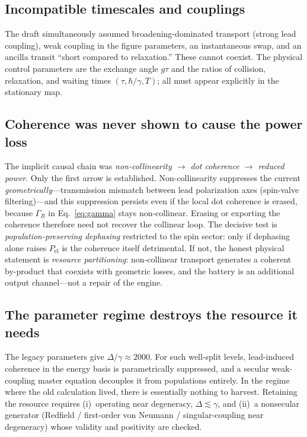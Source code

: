 \documentclass[11pt,a4paper]{article}
\begin{document}
\subsection{Incompatible timescales and couplings}

The draft simultaneously assumed broadening-dominated transport (strong lead coupling), weak coupling in the figure parameters, an instantaneous swap, and an ancilla transit ``short compared to relaxation.'' These cannot coexist. The physical control parameters are the exchange angle $g\tau$ and the ratios of collision, relaxation, and waiting times $(\tau,\hbar/\gamma,T)$; all must appear explicitly in the stationary map.

\subsection{Coherence was never shown to cause the power loss}

The implicit causal chain was \emph{non-collinearity $\to$ dot coherence $\to$ reduced power}. Only the first arrow is established. Non-collinearity suppresses the current \emph{geometrically}---transmission mismatch between lead polarization axes (spin-valve filtering)---and this suppression persists even if the local dot coherence is erased, because $\Gamma_R$ in Eq.~\eqref{eq:gamma} stays non-collinear. Erasing or exporting the coherence therefore need not recover the collinear loop. The decisive test is \emph{population-preserving dephasing} restricted to the spin sector: only if dephasing alone raises $P_{\mathrm{el}}$ is the coherence itself detrimental. If not, the honest physical statement is \emph{resource partitioning}: non-collinear transport generates a coherent by-product that coexists with geometric losses, and the battery is an additional output channel---not a repair of the engine.

\subsection{The parameter regime destroys the resource it needs}

The legacy parameters give $\Delta/\gamma\approx 2000$. For such well-split levels, lead-induced coherence in the energy basis is parametrically suppressed, and a secular weak-coupling master equation decouples it from populations entirely. In the regime where the old calculation lived, there is essentially nothing to harvest. Retaining the resource requires (i)~operating near degeneracy, $\Delta\lesssim\gamma$, and (ii)~a nonsecular generator (Redfield / first-order von Neumann / singular-coupling near degeneracy) whose validity and positivity are checked.
\end{document}
